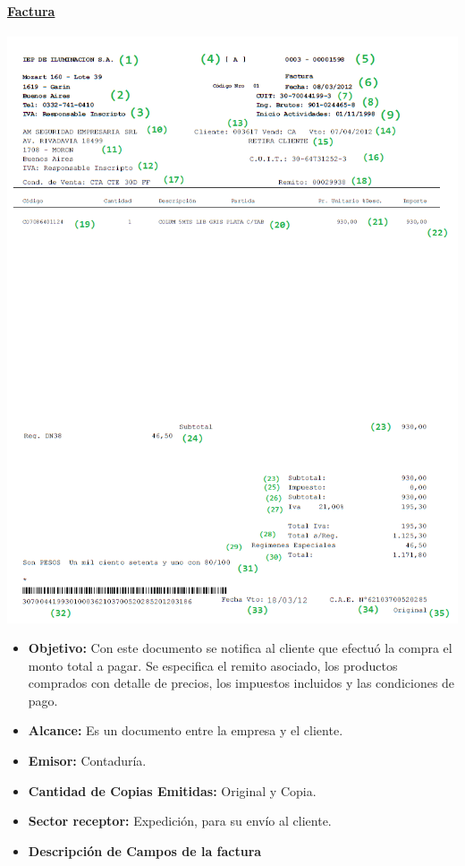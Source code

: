 \paragraph{\underline{Factura}}
\begin{flushleft}
  \includegraphics[scale=0.85]{./Images/FormulariosIEP/Factura.png}\end{flushleft}
  \begin{itemize}
	  \item \textbf{Objetivo:} Con este documento se notifica al cliente que efectu\'o la compra el monto total a pagar. Se especifica el remito asociado, los productos comprados con detalle de precios, los impuestos incluidos y las condiciones de pago.
	  \item \textbf{Alcance:} Es un documento entre la empresa y el cliente.
	  \item \textbf{Emisor:} Contadur\'ia.
	  \item \textbf{Cantidad de Copias Emitidas:} Original y Copia.
	  \item \textbf{Sector receptor:} Expedici\'on, para su env\'io al cliente.
	  \item \textbf{Descripci\'on de Campos de la factura}
  \end{itemize}

